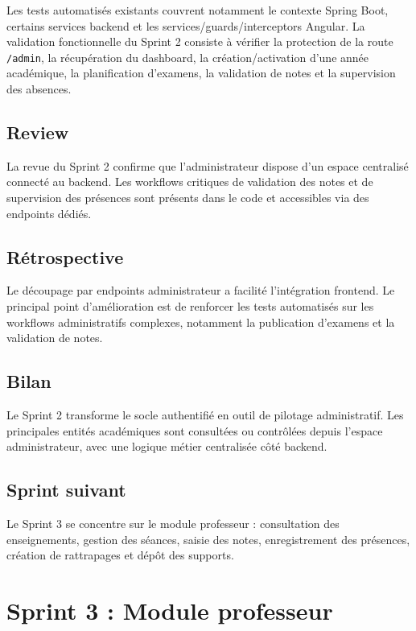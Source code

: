 \documentclass[12pt,a4paper]{report}
\begin{document}
Les tests automatisés existants couvrent notamment le contexte Spring Boot, certains services backend et les services/guards/interceptors Angular. La validation fonctionnelle du Sprint 2 consiste à vérifier la protection de la route \texttt{/admin}, la récupération du dashboard, la création/activation d'une année académique, la planification d'examens, la validation de notes et la supervision des absences.

\section{Review}

La revue du Sprint 2 confirme que l'administrateur dispose d'un espace centralisé connecté au backend. Les workflows critiques de validation des notes et de supervision des présences sont présents dans le code et accessibles via des endpoints dédiés.

\section{Rétrospective}

Le découpage par endpoints administrateur a facilité l'intégration frontend. Le principal point d'amélioration est de renforcer les tests automatisés sur les workflows administratifs complexes, notamment la publication d'examens et la validation de notes.

\section{Bilan}

Le Sprint 2 transforme le socle authentifié en outil de pilotage administratif. Les principales entités académiques sont consultées ou contrôlées depuis l'espace administrateur, avec une logique métier centralisée côté backend.

\section{Sprint suivant}

Le Sprint 3 se concentre sur le module professeur : consultation des enseignements, gestion des séances, saisie des notes, enregistrement des présences, création de rattrapages et dépôt des supports.

\chapter{Sprint 3 : Module professeur}
\end{document}
